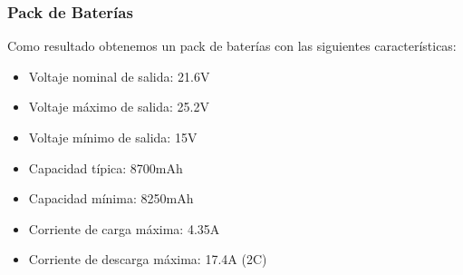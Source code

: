 \documentclass[10pt]{beamer}
\theoremstyle{remark}
\theoremstyle{definition}
\begin{document}
\begin{frame}
    \frametitle{Pack de Bater\'ias}

    Como resultado obtenemos un pack de bater\'ias con las siguientes
    caracter\'isticas:
    \small
    \begin{itemize}
        \item Voltaje nominal de salida: 21.6V
        \item Voltaje m\'aximo de salida: 25.2V
        \item Voltaje m\'inimo de salida: 15V
        \item Capacidad t\'ipica: 8700mAh
        \item Capacidad m\'inima: 8250mAh
        \item Corriente de carga m\'axima: 4.35A
        \item Corriente de descarga m\'axima: 17.4A (2C)
    \end{itemize}


\end{frame}
\end{document}
